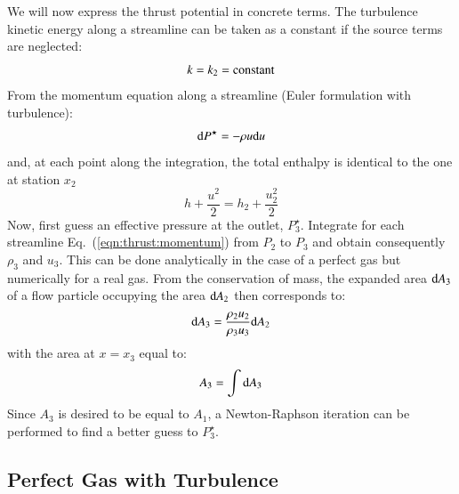 \documentclass{warpdoc}
\numberwithin{equation}{section}
\newcommand{\ordi}{{\rm d}}
\begin{document}
We will now express the thrust potential in concrete terms.
The turbulence kinetic energy along a streamline can be taken as
a constant if the source terms are neglected:
%
\begin{equation}
  k=k_2={\rm constant}
\end{equation}
%
From the momentum equation along a streamline (Euler formulation
with turbulence):
%
\begin{equation}
  \ordi P^\star = - \rho u \ordi u
  \label{eqn:thrust:momentum}
\end{equation}
%
and, at each point along the integration, the total enthalpy is identical
to the one at station $x_2$
%
\begin{equation}
  h + \frac{u^2}{2} =  h_2 + \frac{u_2^2}{2}
\end{equation}
%
Now, first guess an effective pressure at the outlet, $P_3^\star$. 
Integrate for each streamline
Eq.~(\ref{eqn:thrust:momentum}) from $P_2$ to $P_3$ and obtain consequently
$\rho_3$ and $u_3$. This can be done analytically in the case of a perfect
gas but numerically for a real gas. From the conservation of mass,
the expanded area $\ordi A_3$ of a flow particle occupying the
area $\ordi A_2$ then corresponds to:
%
\begin{equation}
  \ordi A_3  = \frac{\rho_2 u_2}{\rho_3 u_3} \ordi A_2
\end{equation}
%
with the area at $x=x_3$ equal to:
%
\begin{equation}
  A_3= \int \ordi A_3
\end{equation}
%
Since $A_3$ is desired to be equal to $A_1$, a Newton-Raphson iteration
can be performed to find a better guess to $P_3^\star$.





\subsection{Perfect Gas with Turbulence}
\end{document}
